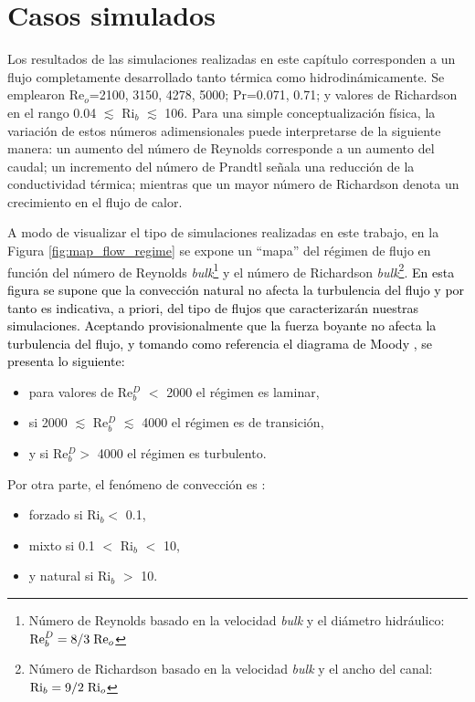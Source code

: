 \newpage

\section{Casos simulados} 

Los resultados de las simulaciones realizadas en este capítulo corresponden a un flujo completamente desarrollado tanto térmica como hidrodinámicamente. Se emplearon Re$_o$=2100, 3150, 4278, 5000; Pr=0.071, 0.71; y valores de Richardson en el rango 0.04 $\lesssim$ Ri$_b$ $\lesssim$ 106. Para una simple conceptualización física, la variación de estos números adimensionales puede interpretarse de la siguiente manera: un aumento del número de Reynolds corresponde a un aumento del caudal; un incremento del número de Prandtl señala una reducción de la conductividad térmica; mientras que un mayor número de Richardson denota un crecimiento en el flujo de calor.

A modo de visualizar el tipo de simulaciones realizadas en este trabajo, en la Figura \ref{fig:map_flow_regime} se expone un ``mapa''  del régimen de flujo en función del número de Reynolds \textit{bulk}\footnote{Número de Reynolds basado en la velocidad \textit{bulk} y el diámetro hidráulico: $\text{Re}^D_b = 8/3 \hspace*{1mm} \text{Re}_o$} y el número de Richardson \textit{bulk}\footnote{Número de Richardson basado en la velocidad \textit{bulk} y el ancho del canal: $\text{Ri}_b = 9/2 \hspace*{1mm} \text{Ri}_o$}. \textcolor{black}{ En esta figura se supone que la convección natural no afecta la turbulencia del flujo y por tanto es indicativa, a priori, del tipo de flujos que caracterizarán nuestras simulaciones. Aceptando provisionalmente que la fuerza boyante no afecta la turbulencia del flujo, y tomando como referencia el diagrama de Moody \cite{white}, se presenta lo siguiente:}



\begin{itemize}
	\item para valores de Re$^D_b$ $<$ 2000 el régimen es laminar,
	\item si 2000 $\lesssim$ Re$^D_b$ $\lesssim$ 4000 el régimen es de transición,
	\item y si Re$^D_b>$ 4000 el régimen es turbulento.
\end{itemize}
Por otra parte, el fenómeno de convección es \cite{incropera,cengelheat}:

\begin{itemize}
	\item forzado si Ri$_b<$ 0.1,
	\item mixto si 0.1 $<$ Ri$_b$ $<$ 10,
	\item y natural si Ri$_b$ $>$ 10.
\end{itemize}

